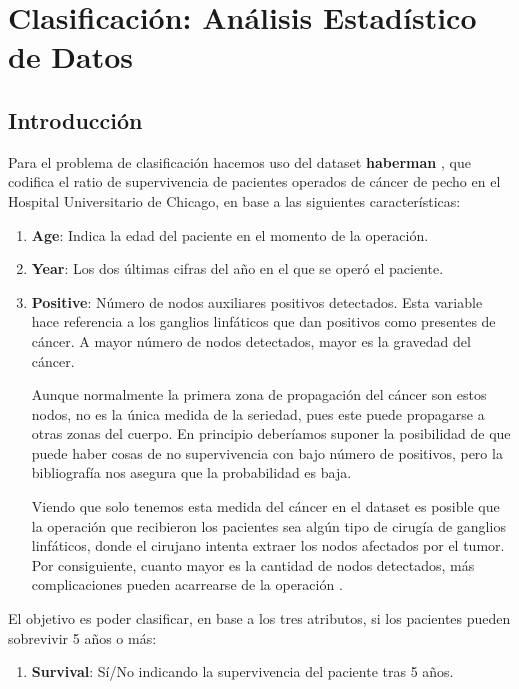 \section{Clasificación: Análisis Estadístico de Datos}

\subsection{Introducción}

Para el problema de clasificación hacemos uso del dataset \textbf{haberman} \cite{haberman}, que codifica el ratio de supervivencia de pacientes operados de cáncer de pecho en el Hospital Universitario de Chicago, en base a las siguientes características:

\begin{enumerate}
\def\labelenumi{\arabic{enumi}.}
    \item \textbf{Age}: Indica la edad del paciente en el momento de la operación.
    \item \textbf{Year}: Los dos últimas cifras del año en el que se operó el paciente.
    \item \textbf{Positive}: Número de nodos auxiliares positivos detectados. Esta variable hace referencia a los ganglios linfáticos que dan positivos como presentes de cáncer. A mayor número de nodos detectados, mayor es la gravedad del cáncer. 
    
    Aunque normalmente la primera zona de propagación del cáncer son estos nodos, no es la única medida de la seriedad, pues este puede propagarse a otras zonas del cuerpo. En principio deberíamos suponer la posibilidad de que puede haber cosas de no supervivencia con bajo número de positivos, pero la bibliografía nos asegura que la probabilidad es baja.

    Viendo que solo tenemos esta medida del cáncer en el dataset es posible que la operación que recibieron los pacientes sea algún tipo de cirugía de ganglios linfáticos, donde el cirujano intenta extraer los nodos afectados por el tumor. Por consiguiente, cuanto mayor es la cantidad de nodos detectados, más complicaciones pueden acarrearse de la operación \cite{cancer1, cancer2}.
\end{enumerate}

El objetivo es poder clasificar, en base a los tres atributos, si los pacientes pueden sobrevivir 5 años o más:

\begin{enumerate}
    \def\labelenumi{\arabic{enumi}.}
    \setcounter{enumi}{3}
    \item \textbf{Survival}: Sí/No indicando la supervivencia del paciente tras 5 años.
\end{enumerate}

